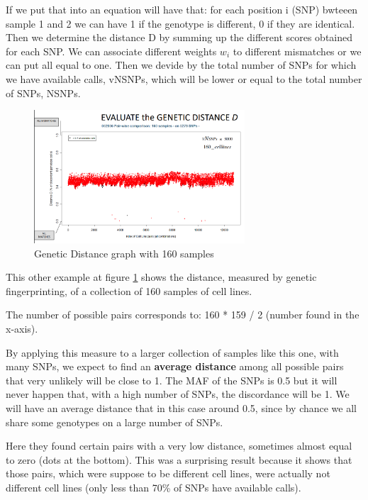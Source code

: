If we put that into an equation will have that: for each position i (SNP) bwteeen sample 1 and 2 we can have 1 if the genotype is different, 0 if they are identical. Then we determine the distance D by summing up the different scores obtained for each SNP. We can associate different weights $w_i$ to different mismatches or we can put all equal to one. Then we devide by the total number of SNPs for which we have available calls, vNSNPs, which will be lower or equal to the total number of SNPs, NSNPs. 

%
\begin{figure}
	\centering
	\includegraphics[width=0.7\textwidth]{loci2.PNG}
	\caption{\label{fig:Distance2}Genetic Distance graph with 160 samples}
\end{figure}

\bigskip
This other example at figure \ref{fig:Distance2} shows the distance, measured by genetic fingerprinting, of a collection of 160 samples of cell lines. 

The number of possible pairs corresponds to: 160 * 159 / 2 (number found in the x-axis). 

By applying this measure to a larger collection of samples like this one, with many SNPs, we expect to find an \textbf{average distance} among all possible pairs that very unlikely will be close to 1. 
The MAF of the SNPs is 0.5 but it will never happen that, with a high number of SNPs, the discordance will be 1. We will have an average distance that in this case around 0.5, since by chance we all share some genotypes on a large number of SNPs. 

Here they found certain pairs with a very low distance, sometimes almost equal to zero (dots at the bottom). This was a surprising result because it shows that those pairs, which were suppose to be different cell lines, were actually not different cell lines (only less than 70\% of SNPs have available calls). 

